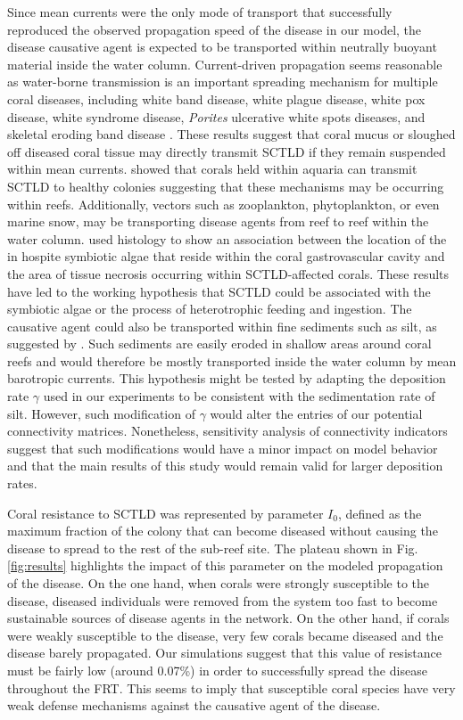 Since mean currents were the only mode of transport that successfully reproduced the observed propagation speed of the disease in our model, the disease causative agent is expected to be transported within neutrally buoyant material inside the water column. Current-driven propagation seems reasonable as water-borne transmission is an important spreading mechanism for multiple coral diseases, including white band disease, white plague disease, white pox disease, white syndrome disease, \textit{Porites} ulcerative white spots diseases, and skeletal eroding band disease \citep{shore2019modes}. These results suggest that coral mucus or sloughed off diseased coral tissue may directly transmit SCTLD if they remain suspended within mean currents. \cite{aeby2019pathogenesis} showed that corals held within aquaria can transmit SCTLD to healthy colonies suggesting that these mechanisms may be occurring within reefs. Additionally, vectors such as zooplankton, phytoplankton, or even marine snow, may be transporting disease agents from reef to reef within the water column. \cite{landsberg2018} used histology to show an association between the location of the in hospite symbiotic algae that reside within the coral gastrovascular cavity and the area of tissue necrosis occurring within SCTLD-affected corals. These results have led to the working hypothesis that SCTLD could be associated with the symbiotic algae or the process of heterotrophic feeding and ingestion. The causative agent could also be transported within fine sediments such as silt, as suggested by \cite{rosales2020rhodobacterales}. Such sediments are easily eroded in shallow areas around coral reefs and would therefore be mostly transported inside the water column by mean barotropic currents. This hypothesis might be tested by adapting the deposition rate $\gamma$ used in our experiments to be consistent with the sedimentation rate of silt. However, such modification of $\gamma$ would alter the entries of our potential connectivity matrices. Nonetheless, sensitivity analysis of connectivity indicators suggest that such modifications would have a minor impact on model behavior and that the main results of this study would remain valid for larger deposition rates.

Coral resistance to SCTLD was represented by parameter $I_0$, defined as the maximum fraction of the colony that can become diseased without causing the disease to spread to the rest of the sub-reef site. The plateau shown in Fig. \ref{fig:results} highlights the impact of this parameter on the modeled propagation of the disease. On the one hand, when corals were strongly susceptible to the disease, diseased individuals were removed from the system too fast to become sustainable sources of disease agents in the network. On the other hand, if corals were weakly susceptible to the disease, very few corals became diseased and the disease barely propagated. Our simulations suggest that this value of resistance must be fairly low (around 0.07\%) in order to successfully spread the disease throughout the FRT. This seems to imply that susceptible coral species have very weak defense mechanisms against the causative agent of the disease.

